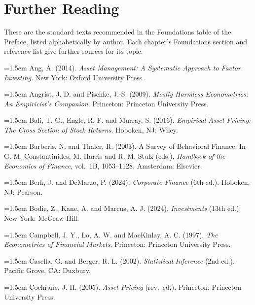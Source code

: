 \chapter*{Further Reading}
\label{furtherreading}

These are the standard texts recommended in the Foundations table of the Preface, listed alphabetically by author. Each chapter's Foundations section and reference list give further sources for its topic.

\begingroup
\setlength{\parindent}{0pt}
\setlength{\parskip}{4pt}
\hangindent=1.5em Ang, A. (2014). \emph{Asset Management: A Systematic Approach to Factor Investing}. New York: Oxford University Press.

\hangindent=1.5em Angrist, J. D. and Pischke, J.-S. (2009). \emph{Mostly Harmless Econometrics: An Empiricist's Companion}. Princeton: Princeton University Press.

\hangindent=1.5em Bali, T. G., Engle, R. F. and Murray, S. (2016). \emph{Empirical Asset Pricing: The Cross Section of Stock Returns}. Hoboken, NJ: Wiley.

\hangindent=1.5em Barberis, N. and Thaler, R. (2003). A Survey of Behavioral Finance. In G. M. Constantinides, M. Harris and R. M. Stulz (eds.), \emph{Handbook of the Economics of Finance}, vol.\ 1B, 1053--1128. Amsterdam: Elsevier.

\hangindent=1.5em Berk, J. and DeMarzo, P. (2024). \emph{Corporate Finance} (6th ed.). Hoboken, NJ: Pearson.

\hangindent=1.5em Bodie, Z., Kane, A. and Marcus, A. J. (2024). \emph{Investments} (13th ed.). New York: McGraw Hill.

\hangindent=1.5em Campbell, J. Y., Lo, A. W. and MacKinlay, A. C. (1997). \emph{The Econometrics of Financial Markets}. Princeton: Princeton University Press.

\hangindent=1.5em Casella, G. and Berger, R. L. (2002). \emph{Statistical Inference} (2nd ed.). Pacific Grove, CA: Duxbury.

\hangindent=1.5em Cochrane, J. H. (2005). \emph{Asset Pricing} (rev.\ ed.). Princeton: Princeton University Press.

